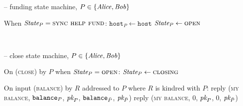 \begin{center}
\begin{systembox}{\fchan{} -- funding state machine, $P \in \{\mathit{Alice}, \mathit{Bob}\}$}
\begin{algorithmic}[1]
      \State When $\itistate_P = \textsc{sync help fund}$:
      \Indent
          \State $\texttt{host}_P \gets \texttt{host}$
          \State {}
          \State $\itistate_P \gets \textsc{open}$
          \label{code:functionality:fund:help-fund-end}
        \EndIf
      \EndIndent
    \end{algorithmic}
  \end{systembox}
  \label{code:functionality:fund}
\end{center} \ \\

\begin{center}
  \begin{systembox}{\fchan{} -- close state machine, $P \in \{\mathit{Alice},
  \mathit{Bob}\}$}
    \begin{algorithmic}[1]
      \State On (\textsc{close}) by $P$ when $\itistate_P =
      \textsc{open}$:
      \Indent
        \State $\itistate_P \gets \textsc{closing}$
      \EndIndent
      \Statex

      \State On input (\textsc{balance}) by $R$ addressed to $P$ where $R$ is kindred with
      $P$:
      \Indent
          \State reply (\textsc{my balance}, $\texttt{balance}_{P}$, $\textit{pk}_{P}$,
          $\texttt{balance}_{\bar{P}}$, $\textit{pk}_{\bar{P}}$)
        \Else
          \State reply (\textsc{my balance}, $0$, $\textit{pk}_{P}$, $0$, $\textit{pk}_{\bar{P}}$)
        \EndIf
      \EndIndent
      \Statex


\end{algorithmic}
\end{systembox}
\end{center}
